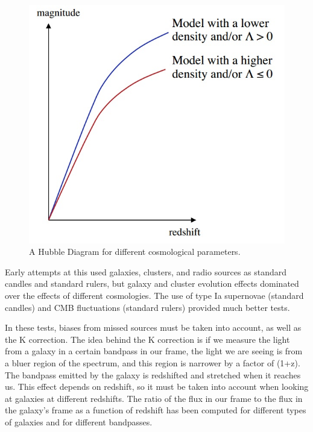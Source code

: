 \begin{figure}[!h]
\begin{center}
\includegraphics[width=\textwidth]{hubble.jpg}
\end{center}
\caption{A Hubble Diagram for different cosmological parameters.
\label{fig:hubble}}
\end{figure}

Early attempts at this used galaxies, clusters, and radio sources as standard 
candles and standard rulers, but galaxy and cluster evolution effects 
dominated over the effects of different cosmologies.  The use of type Ia 
supernovae (standard candles) and CMB fluctuations (standard rulers) provided 
much better tests.  

In these tests, biases from missed sources must be taken into account, as well 
as the K correction.  The idea behind the K correction is if we measure the 
light from a galaxy in a certain bandpass in our frame, the light we are seeing 
is from a bluer region of the spectrum, and this region is narrower by a 
factor of (1+z).  The bandpass emitted by the galaxy is redshifted and 
stretched when it reaches us.  This effect depends on redshift, so it must be 
taken into account when looking at galaxies at different redshifts.  The 
ratio of the flux in our frame to the flux in the galaxy's frame as a function 
of redshift has been computed for different types of galaxies and for different 
bandpasses.  

